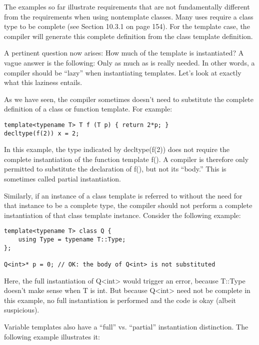 
The examples so far illustrate requirements that are not fundamentally different from the requirements when using nontemplate classes. Many uses require a class type to be complete (see Section 10.3.1 on page 154). For the template case, the compiler will generate this complete definition from the class template definition.

A pertinent question now arises: How much of the template is instantiated? A vague answer is the following: Only as much as is really needed. In other words, a compiler should be “lazy” when instantiating templates. Let’s look at exactly what this laziness entails.


As we have seen, the compiler sometimes doesn’t need to substitute the complete definition of a class or function template. For example:

\begin{lstlisting}[style=styleCXX]
template<typename T> T f (T p) { return 2*p; }
decltype(f(2)) x = 2;
\end{lstlisting}

In this example, the type indicated by decltype(f(2)) does not require the complete instantiation of the function template f(). A compiler is therefore only permitted to substitute the declaration of f(), but not its “body.” This is sometimes called partial instantiation.

Similarly, if an instance of a class template is referred to without the need for that instance to be a complete type, the compiler should not perform a complete instantiation of that class template instance. Consider the following example:

\begin{lstlisting}[style=styleCXX]
template<typename T> class Q {
	using Type = typename T::Type;
};

Q<int>* p = 0; // OK: the body of Q<int> is not substituted
\end{lstlisting}

Here, the full instantiation of Q<int> would trigger an error, because T::Type doesn’t make sense when T is int. But because Q<int> need not be complete in this example, no full instantiation is performed and the code is okay (albeit suspicious).

Variable templates also have a “full” vs. “partial” instantiation distinction. The following example illustrates it:

